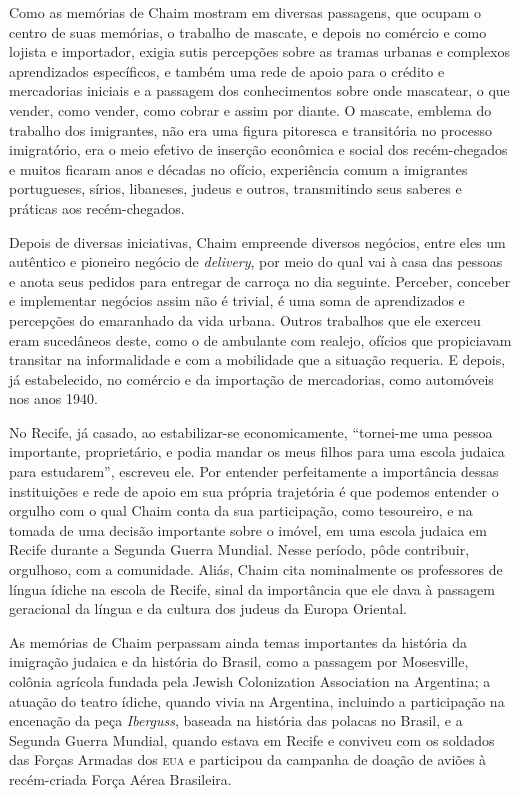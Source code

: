 Como as memórias de Chaim mostram em diversas passagens, que ocupam o
centro de suas memórias, o trabalho de mascate, e depois no comércio e
como lojista e importador, exigia sutis percepções sobre as tramas
urbanas e complexos aprendizados específicos, e também uma rede de apoio
para o crédito e mercadorias iniciais e a passagem dos conhecimentos
sobre onde mascatear, o que vender, como vender, como cobrar e assim por
diante. O mascate, emblema do trabalho dos imigrantes, não era uma
figura pitoresca e transitória no processo imigratório, era o meio
efetivo de inserção econômica e social dos recém-chegados e muitos
ficaram anos e décadas no ofício, experiência comum a imigrantes
portugueses, sírios, libaneses, judeus e outros, transmitindo seus
saberes e práticas aos recém-chegados.

Depois de diversas iniciativas, Chaim empreende diversos negócios, entre
eles um autêntico e pioneiro negócio de \textit{delivery}, por meio do qual
vai à casa das pessoas e anota seus pedidos para entregar de carroça no
dia seguinte. Perceber, conceber e implementar negócios assim não é
trivial, é uma soma de aprendizados e percepções do emaranhado da vida
urbana. Outros trabalhos que ele exerceu eram sucedâneos deste, como o
de ambulante com realejo, ofícios que propiciavam transitar na
informalidade e com a mobilidade que a situação requeria. E depois, já
estabelecido, no comércio e da importação de mercadorias, como
automóveis nos anos 1940.

No Recife, já casado, ao estabilizar-se economicamente, ``tornei-me uma
pessoa importante, proprietário, e podia mandar os meus filhos para uma
escola judaica para estudarem'', escreveu ele. Por entender
perfeitamente a importância dessas instituições e rede de apoio em sua
própria trajetória é que podemos entender o orgulho com o qual Chaim
conta da sua participação, como tesoureiro, e na tomada de uma decisão
importante sobre o imóvel, em uma escola judaica em Recife durante a
Segunda Guerra Mundial. Nesse período, pôde contribuir, orgulhoso, com a
comunidade. Aliás, Chaim cita nominalmente os professores de língua
ídiche na escola de Recife, sinal da importância que ele dava à passagem
geracional da língua e da cultura dos judeus da Europa Oriental.

As memórias de Chaim perpassam ainda temas importantes da história da
imigração judaica e da história do Brasil, como a passagem por
Mosesville, colônia agrícola fundada pela Jewish Colonization
Association na Argentina; a atuação do teatro ídiche, quando vivia na
Argentina, incluindo a participação na encenação da peça \textit{Iberguss},
baseada na história das polacas no Brasil, e a Segunda Guerra Mundial,
quando estava em Recife e conviveu com os soldados das Forças Armadas
dos \textsc{eua} e participou da campanha de doação de aviões à recém-criada
Força Aérea Brasileira.

